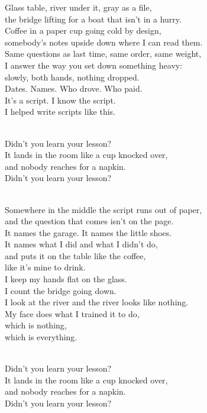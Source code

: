 \begin{lyrics}

Glass table, river under it, gray as a file,\\
the bridge lifting for a boat that isn't in a hurry.\\
Coffee in a paper cup going cold by design,\\
somebody's notes upside down where I can read them.\\
Same questions as last time, same order, same weight,\\
I answer the way you set down something heavy:\\
slowly, both hands, nothing dropped.\\
Dates. Names. Who drove. Who paid.\\
It's a script. I know the script.\\
I helped write scripts like this.

\\
Didn't you learn your lesson?\\
It lands in the room like a cup knocked over,\\
and nobody reaches for a napkin.\\
Didn't you learn your lesson?

\\
Somewhere in the middle the script runs out of paper,\\
and the question that comes isn't on the page.\\
It names the garage. It names the little shoes.\\
It names what I did and what I didn't do,\\
and puts it on the table like the coffee,\\
like it's mine to drink.\\
I keep my hands flat on the glass.\\
I count the bridge going down.\\
I look at the river and the river looks like nothing.\\
My face does what I trained it to do,\\
which is nothing,\\
which is everything.

\\
Didn't you learn your lesson?\\
It lands in the room like a cup knocked over,\\
and nobody reaches for a napkin.\\
Didn't you learn your lesson?


\end{lyrics}
